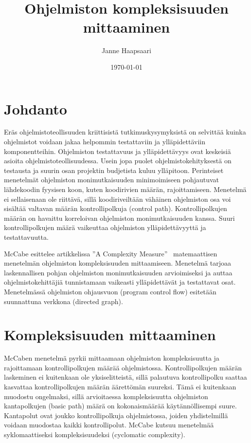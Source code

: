 \documentclass[finnish]{tktltiki2}
\title{Ohjelmiston kompleksisuuden mittaaminen}
\author{Janne Haapsaari}
\date{\today}
\theoremstyle{definition}
\theoremstyle{remark}
\begin{document}

\frontmatter      %

\maketitle        %

\tableofcontents  %


\mainmatter       %

\section{Johdanto}

Eräs ohjelmistoteollisuuden kriittisistä tutkimuskysymyksistä on selvittää kuinka ohjelmistot voidaan jakaa helpommin testattaviin ja ylläpidettäviin komponentteihin. Ohjelmiston testattavuus ja ylläpidettävyys ovat keskeisiä asioita ohjelmistoteollisuudessa. Usein jopa puolet ohjelmistokehityksestä on testausta ja suurin osan projektin budjetista kuluu ylläpitoon. Perinteiset menetelmät ohjelmiston monimutkaisuuden minimoimiseen pohjautuvat lähdekoodin fyysisen koon, kuten koodirivien määrän, rajoittamiseen. Menetelmä ei sellaisenaan ole riittävä, sillä koodiriveiltään vähäinen ohjelmiston osa voi sisältää valtavan määrän kontrollipolkuja (control path). Kontrollipolkujen määrän on havaittu korreloivan ohjelmiston monimutkaisuuden kanssa. Suuri kontrollipolkujen määrä vaikeuttaa ohjelmiston ylläpidettävyyttä ja testattavuutta.

McCabe esittelee artikkelissa ''A Complexity Measure''~\cite{McGabe} matemaattisen menetelmän ohjelmiston kompleksisuuden mittaamiseen. Menetelmä tarjoaa laskennallisen pohjan ohjelmiston monimutkaisuuden arvioimiseksi ja auttaa ohjelmistokehittäjiä tunnistamaan vaikeasti ylläpidettävät ja testattavat osat. Menetelmässä ohjelmiston ohjausvuon (program control flow) esitetään suunnattuna verkkona (directed graph).

\section{Kompleksisuuden mittaaminen}

McCaben menetelmä pyrkii mittaamaan ohjelmiston kompleksisuutta ja rajoittamaan kontrollipolkujen määrää ohjelmistossa. Kontrollipolkujen määrän laskeminen ei kuitenkaan ole yksiselitteistä, sillä palautuva kontrollipolku saattaa kasvattaa kontrollipolkujen määrän äärettömän suureksi. Tämä ei kuitenkaan muodostu ongelmaksi, sillä arvioitaessa kompleksisuutta ohjelmiston kantapolkujen (basic path) määrä on kokonaismäärää käytännöllisempi suure. Kantapolut ovat joukko kontrollipolkuja ohjelmistossa, joiden yhdistelmillä voidaan muodostaa kaikki kontrollipolut. McCabe kutsuu menetelmää syklomaattiseksi kompleksisuudeksi (cyclomatic complexity).
\end{document}
